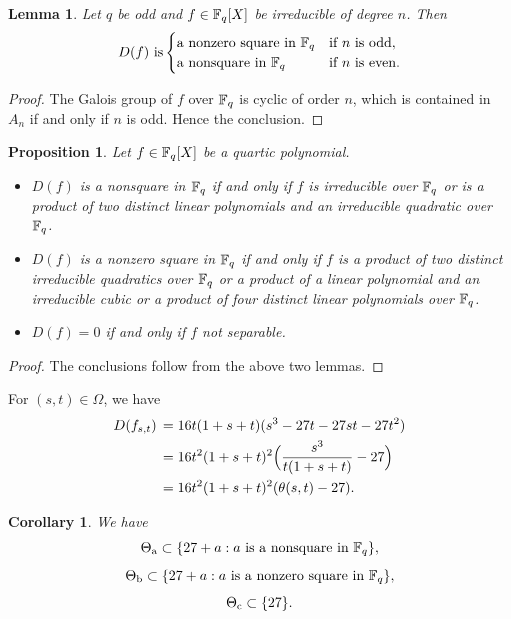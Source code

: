 \documentclass{amsart}
\newtheorem{lem}[thm]{Lemma}
\newtheorem{cor}[thm]{Corollary}
\newtheorem{prop}[thm]{Proposition}
\numberwithin{equation}{section}
\theoremstyle{definition}
\newcommand{\f}{\Bbb F}
\begin{document}
\begin{lem}\label{disc}
Let $q$ be odd and $f\in\f_q[X]$ be irreducible of degree $n$. Then
\[
D(f)\ \text{\rm is}\begin{cases}
\text{\rm a nonzero square in $\f_q$} &\text{\rm if $n$ is odd},\cr
\text{\rm a nonsquare in $\f_q$} &\text{\rm if $n$ is even}.
\end{cases}
\]
\end{lem}

\begin{proof}
The Galois group of $f$ over $\f_q$ is cyclic of order $n$, which is contained in $A_n$ if and only if $n$ is odd. Hence the conclusion.
\end{proof}


\begin{prop}\label{P-Q}
Let $f\in\f_q[X]$ be a quartic polynomial.
\begin{itemize}
\item[(i)] $D(f)$ is a nonsquare in $\f_q$ if and only if  $f$ is irreducible over $\f_q$ or is a product of two distinct linear polynomials and an irreducible quadratic over $\f_q$.

\item[(ii)] $D(f)$ is a nonzero square in $\f_q$ if and only if $f$ is a product of two distinct irreducible quadratics over $\f_q$ or a product of a linear polynomial and an irreducible cubic or a product of four distinct linear polynomials over $\f_q$.

\item[(iii)] $D(f)=0$ if and only if $f$ not separable.
\end{itemize}
\end{prop}

\begin{proof}
The conclusions follow from the above two lemmas.
\end{proof}

For $(s,t)\in\Omega$, we have
\begin{align}\label{Dfst}
D(f_{s,t})\,& =16 t (1+s+t) (s^3-27 t-27 s t-27 t^2)\\
&=16 t^2(1+s+t)^2\Bigl(\frac{s^3}{t(1+s+t)}-27\Bigr)\cr
&=16 t^2(1+s+t)^2(\theta(s,t)-27).\nonumber
\end{align}

\begin{cor}\label{C-tha}
We have
\begin{equation}\label{tha1}
\Theta_{\rm a}\subset\{27+a: \text{\rm $a$ is a nonsquare in $\f_q$}\},
\end{equation}
\begin{equation}\label{tha2}
\Theta_{\rm b}\subset\{27+a: \text{\rm $a$ is a nonzero square in $\f_q$}\},
\end{equation}
\begin{equation}\label{tha3}
\Theta_{\rm c}\subset\{27\}.
\end{equation}
\end{cor}
\end{document}
